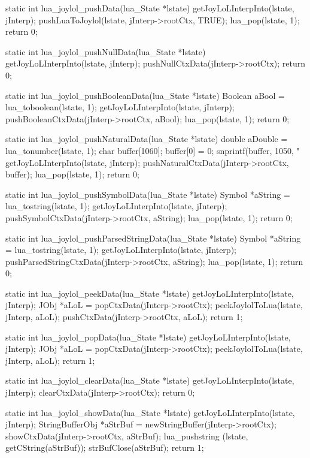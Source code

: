 \startCCode
static int lua_joylol_pushData(lua_State *lstate) {
  getJoyLoLInterpInto(lstate, jInterp);
  pushLuaToJoylol(lstate, jInterp->rootCtx, TRUE);
  lua_pop(lstate, 1);
  return 0;
}

static int lua_joylol_pushNullData(lua_State *lstate) {
  getJoyLoLInterpInto(lstate, jInterp);
  pushNullCtxData(jInterp->rootCtx);
  return 0;
}

static int lua_joylol_pushBooleanData(lua_State *lstate) {
  Boolean aBool = lua_toboolean(lstate, 1);
  getJoyLoLInterpInto(lstate, jInterp);
  pushBooleanCtxData(jInterp->rootCtx, aBool);
  lua_pop(lstate, 1);
  return 0;
}

static int lua_joylol_pushNaturalData(lua_State *lstate) {
  double aDouble = lua_tonumber(lstate, 1);
  char buffer[1060];
  buffer[0] = 0;
  snprintf(buffer, 1050, "%
  getJoyLoLInterpInto(lstate, jInterp);
  pushNaturalCtxData(jInterp->rootCtx, buffer);
  lua_pop(lstate, 1);
  return 0;
}

static int lua_joylol_pushSymbolData(lua_State *lstate) {
  Symbol *aString = lua_tostring(lstate, 1);
  getJoyLoLInterpInto(lstate, jInterp);
  pushSymbolCtxData(jInterp->rootCtx, aString);
  lua_pop(lstate, 1);
  return 0;
}

static int lua_joylol_pushParsedStringData(lua_State *lstate) {
  Symbol *aString = lua_tostring(lstate, 1);
  getJoyLoLInterpInto(lstate, jInterp);
  pushParsedStringCtxData(jInterp->rootCtx, aString);
  lua_pop(lstate, 1);
  return 0;
}

static int lua_joylol_peekData(lua_State *lstate) {
  getJoyLoLInterpInto(lstate, jInterp);
  JObj *aLoL = popCtxData(jInterp->rootCtx);
  peekJoylolToLua(lstate, jInterp, aLoL);
  pushCtxData(jInterp->rootCtx, aLoL);
  return 1;
}

static int lua_joylol_popData(lua_State *lstate) {
  getJoyLoLInterpInto(lstate, jInterp);
  JObj *aLoL = popCtxData(jInterp->rootCtx);
  peekJoylolToLua(lstate, jInterp, aLoL);
  return 1;
}

static int lua_joylol_clearData(lua_State *lstate) {
  getJoyLoLInterpInto(lstate, jInterp);
  clearCtxData(jInterp->rootCtx);
  return 0;
}

static int lua_joylol_showData(lua_State *lstate) {
  getJoyLoLInterpInto(lstate, jInterp);
  StringBufferObj *aStrBuf = newStringBuffer(jInterp->rootCtx);
  showCtxData(jInterp->rootCtx, aStrBuf);
  lua_pushstring (lstate, getCString(aStrBuf));
  strBufClose(aStrBuf);
  return 1;
}
\stopCCode

